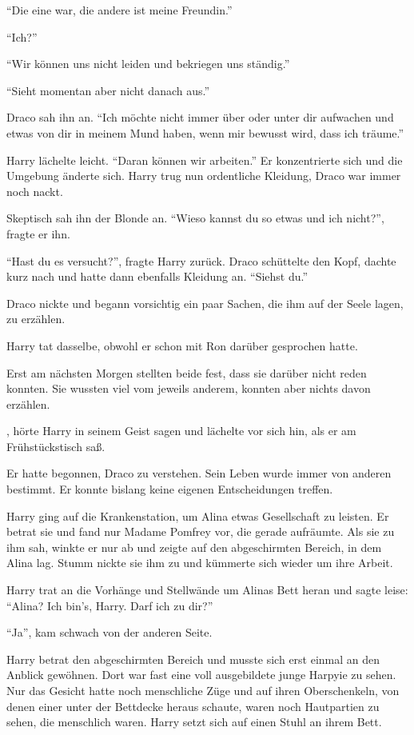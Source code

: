 \enquote{Die eine war, die andere ist meine Freundin.}

\enquote{Ich?}

\enquote{Wir können uns nicht leiden und bekriegen uns ständig.}

\enquote{Sieht momentan aber nicht danach aus.}

Draco sah ihn an. \enquote{Ich möchte nicht immer über oder unter dir aufwachen und etwas von dir in meinem Mund haben, wenn mir bewusst wird, dass ich träume.}

Harry lächelte leicht. \enquote{Daran können wir arbeiten.} Er konzentrierte sich und die Umgebung änderte sich. Harry trug nun ordentliche Kleidung, Draco war immer noch nackt.

Skeptisch sah ihn der Blonde an. \enquote{Wieso kannst du so etwas und ich nicht?}, fragte er ihn.

\enquote{Hast du es versucht?}, fragte Harry zurück. Draco schüttelte den Kopf, dachte kurz nach und hatte dann ebenfalls Kleidung an. \enquote{Siehst du.}

Draco nickte und begann vorsichtig ein paar Sachen, die ihm auf der Seele lagen, zu erzählen.

Harry tat dasselbe, obwohl er schon mit Ron darüber gesprochen hatte.

Erst am nächsten Morgen stellten beide fest, dass sie darüber nicht reden konnten. Sie wussten viel vom jeweils anderem, konnten aber nichts davon erzählen.

, hörte Harry in seinem Geist sagen und lächelte vor sich hin, als er am Frühstückstisch saß.

Er hatte begonnen, Draco zu verstehen. Sein Leben wurde immer von anderen bestimmt. Er konnte bislang keine eigenen Entscheidungen treffen.

\trenn

Harry ging auf die Krankenstation, um Alina etwas Gesellschaft zu leisten. Er betrat sie und fand nur Madame Pomfrey vor, die gerade aufräumte. Als sie zu ihm sah, winkte er nur ab und zeigte auf den abgeschirmten Bereich, in dem Alina lag. Stumm nickte sie ihm zu und kümmerte sich wieder um ihre Arbeit.

Harry trat an die Vorhänge und Stellwände um Alinas Bett heran und sagte leise: \enquote{Alina? Ich bin’s, Harry. Darf ich zu dir?}

\enquote{Ja}, kam schwach von der anderen Seite.

Harry betrat den abgeschirmten Bereich und musste sich erst einmal an den Anblick gewöhnen. Dort war fast eine voll ausgebildete junge Harpyie zu sehen. Nur das Gesicht hatte noch menschliche Züge und auf ihren Oberschenkeln, von denen einer unter der Bettdecke heraus schaute, waren noch Hautpartien zu sehen, die menschlich waren. Harry setzt sich auf einen Stuhl an ihrem Bett.

